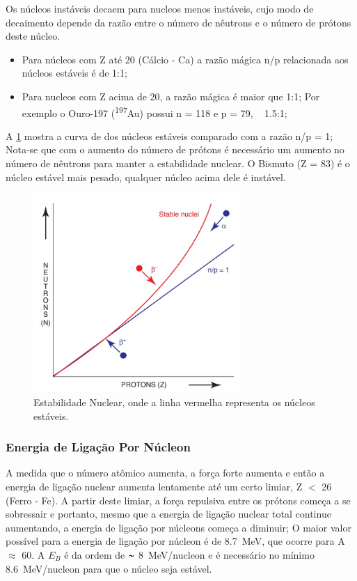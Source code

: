 \documentclass[11pt,a4paper]{article}
\newcounter{exemplo}
\begin{document}
    Os núcleos instáveis decaem para nucleos menos instáveis, cujo modo de decaimento depende da razão entre o número de nêutrons e o número de prótons deste núcleo. 

    \begin{itemize}
		\item Para núcleos com Z até 20 (Cálcio - Ca) a razão mágica n/p relacionada aos núcleos estáveis é de 1:1;
		\item Para nucleos com Z acima de 20, a razão mágica é maior que 1:1; Por exemplo o Ouro-197 (\textsuperscript{197}Au)  possui n = 118 e p = 79, ~ 1.5:1;
	\end{itemize}            

    A \ref{fig:estabilidadeNuclear} mostra a curva de dos núcleos estáveis comparado com a razão n/p = 1; Nota-se que com o aumento do número de prótons é necessário um aumento no número de nêutrons para manter a estabilidade nuclear. O Bismuto (Z = 83) é o núcleo estável mais pesado, qualquer núcleo acima dele é instável.

    \begin{figure}[h]
		\centering
		\includegraphics[width=0.7\textwidth]{Imagens/graficoNucleosEstaveis.jpg}
		\caption{Estabilidade Nuclear, onde a linha vermelha representa os núcleos estáveis.}
		\label{fig:estabilidadeNuclear}
	\end{figure}            
        
\subsubsection*{Energia de Ligação Por Núcleon}
                
    A medida que o número atômico aumenta, a força forte aumenta e então a energia de ligação nuclear aumenta lentamente até um certo limiar, Z $<$ 26 (Ferro - Fe). A partir deste limiar, a força repulsiva entre os prótons começa a se sobressair e portanto, mesmo que a energia de ligação nuclear total continue aumentando, a energia de ligação por núcleons começa a diminuir; O maior valor possível para a energia de ligação por núcleon é de  \qty{8.7}{MeV}, que ocorre para A $\approx$ 60. A $E_B$ é da ordem de $\thicksim$ \qty{8}{MeV/nucleon} e é necessário no mínimo \qty{8.6}{MeV/nucleon} para que o núcleo seja estável.
\end{document}
